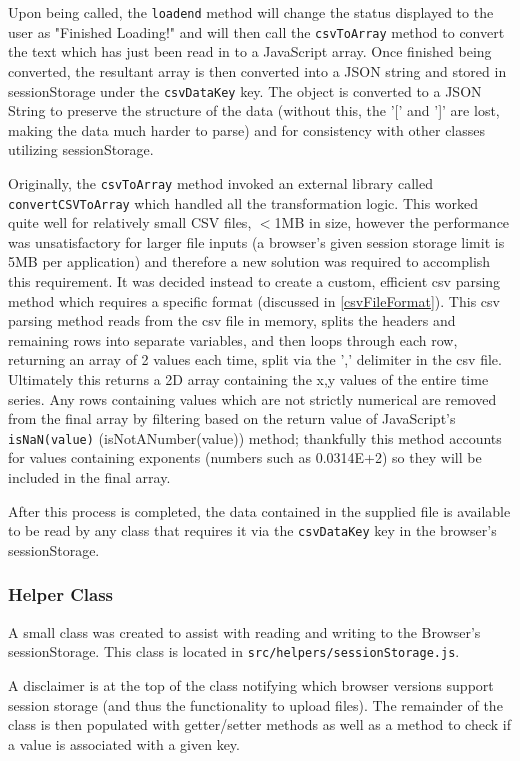 Upon being called, the \verb|loadend| method will change the status displayed to the user as "Finished Loading!" and will then call the \verb|csvToArray| method to convert the text which has just been read in to a JavaScript array. Once finished being converted, the resultant array is then converted into a JSON string and stored in sessionStorage under the \verb|csvDataKey| key. The object is converted to a JSON String to preserve the structure of the data (without this, the '[' and ']' are lost, making the data much harder to parse) and for consistency with other classes utilizing sessionStorage.

Originally, the \verb|csvToArray| method invoked an external library called \verb|convertCSVToArray| which handled all the transformation logic. This worked quite well for relatively small CSV files, $<$1MB in size, however the performance was unsatisfactory for larger file inputs (a browser's given session storage limit is 5MB per application) and therefore a new solution was required to accomplish this requirement. It was decided instead to create a custom, efficient csv parsing method which requires a specific format (discussed in \ref{csvFileFormat}). This csv parsing method reads from the csv file in memory, splits the headers and remaining rows into separate variables, and then loops through each row, returning an array of 2 values each time, split via the ',' delimiter in the csv file. Ultimately this returns a 2D array containing the x,y values of the entire time series. Any rows containing values which are not strictly numerical are removed from the final array by filtering based on the return value of JavaScript's \verb|isNaN(value)| (isNotANumber(value)) method; thankfully this method accounts for values containing exponents (numbers such as 0.0314E+2) so they will be included in the final array. 

After this process is completed, the data contained in the supplied file is available to be read by any class that requires it via the \verb|csvDataKey| key in the browser's sessionStorage. 

\subsubsection{Helper Class}
A small class was created to assist with reading and writing to the Browser's sessionStorage. This class is located in \verb|src/helpers/sessionStorage.js|.

A disclaimer is at the top of the class notifying which browser versions support session storage (and thus the functionality to upload files). The remainder of the class is then populated with getter/setter methods as well as a method to check if a value is associated with a given key. 

